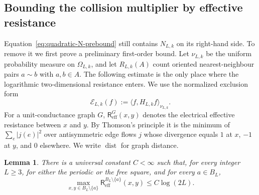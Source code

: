\documentclass[11pt]{article}
\numberwithin{equation}{section}
\newtheorem{lemma}[theorem]{Lemma}
\theoremstyle{remark}
\newcommand{\1}{\mathbf 1}
\newcommand{\cE}{\mathcal E}
\newcommand{\dist}{\operatorname{dist}}
\begin{document}
\subsection{Bounding the collision multiplier by effective resistance}
\label{subsec:contact-resistance}

Equation~\eqref{eq:quadratic-N-prebound} still contains \(N_{L,k}\) on its
right-hand side.  To remove it we first prove a preliminary first-order bound.
Let \(\nu_{L,k}\) be the uniform probability measure on
\(\Omega_{L,k}\), and let \(R_{L,k}(A)\) count oriented nearest-neighbour
pairs \(a\sim b\) with \(a,b\in A\).  The following estimate is the only
place where the logarithmic two-dimensional resistance enters.
We use the normalized exclusion form
\begin{equation}
 \cE_{L,k}(f):=\langle f,H_{L,k}f\rangle_{\nu_{L,k}}.
 \label{eq:normalized-exclusion-form}
\end{equation}
For a unit-conductance graph \(G\),
\(\mathsf R_{\mathrm{eff}}^G(x,y)\) denotes the electrical effective
resistance between \(x\) and \(y\).  By Thomson's principle it is the
minimum of \(\sum_e|j(e)|^2\) over antisymmetric edge flows \(j\) whose
divergence equals \(1\) at \(x\), \(-1\) at \(y\), and \(0\) elsewhere.
We write \(\dist\) for graph distance.

\begin{lemma}
\label{lem:punctured-resistance}
There is a universal constant \(C<\infty\) such that, for every integer
\(L\geq3\), for either the periodic or the free square, and for every
\(a\in B_L\),
\begin{equation}
 \max_{x,y\in B_L\setminus\{a\}}
 \mathsf R_{\mathrm{eff}}^{B_L\setminus\{a\}}(x,y)
 \leq C\log(2L).
 \label{eq:punctured-resistance}
\end{equation}
\end{lemma}
\end{document}
